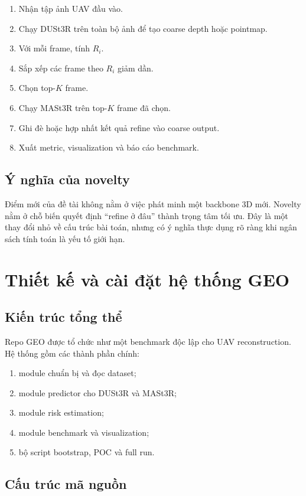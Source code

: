 \documentclass[12pt,a4paper,oneside]{report}
\begin{document}
\begin{enumerate}[leftmargin=1.5em]
  \item Nhận tập ảnh UAV đầu vào.
  \item Chạy DUSt3R trên toàn bộ ảnh để tạo coarse depth hoặc pointmap.
  \item Với mỗi frame, tính $R_i$.
  \item Sắp xếp các frame theo $R_i$ giảm dần.
  \item Chọn top-$K$ frame.
  \item Chạy MASt3R trên top-$K$ frame đã chọn.
  \item Ghi đè hoặc hợp nhất kết quả refine vào coarse output.
  \item Xuất metric, visualization và báo cáo benchmark.
\end{enumerate}

\section{Ý nghĩa của novelty}

Điểm mới của đề tài không nằm ở việc phát minh một backbone 3D mới. Novelty nằm ở chỗ biến quyết định ``refine ở đâu'' thành trọng tâm tối ưu. Đây là một thay đổi nhỏ về cấu trúc bài toán, nhưng có ý nghĩa thực dụng rõ ràng khi ngân sách tính toán là yếu tố giới hạn.

\chapter{Thiết kế và cài đặt hệ thống GEO}

\section{Kiến trúc tổng thể}

Repo GEO được tổ chức như một benchmark độc lập cho UAV reconstruction. Hệ thống gồm các thành phần chính:
\begin{enumerate}[leftmargin=1.5em]
  \item module chuẩn bị và đọc dataset;
  \item module predictor cho DUSt3R và MASt3R;
  \item module risk estimation;
  \item module benchmark và visualization;
  \item bộ script bootstrap, POC và full run.
\end{enumerate}

\section{Cấu trúc mã nguồn}
\end{document}
